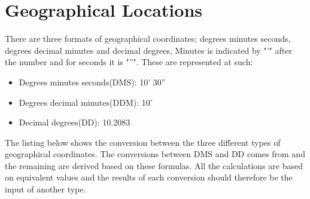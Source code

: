 \section{Geographical Locations} \label{sec:geo_coordinates}
There are three formats of geographical coordinates; degrees minutes seconds, degrees decimal minutes and decimal degrees\cite{geo_types}, Minutes is indicated by "'" after the number and for seconds it is "''". These are represented at such:
\begin{itemize}
	\item Degrees minutes seconds(DMS): 10' 30''
	\item Degrees decimal minutes(DDM): 10'
	\item Decimal degrees(DD): 10.2083\degree
\end{itemize}

The listing below shows the conversion between the three different types of geographical coordinates. The conversions between DMS and DD comes from\cite{geo_converter} and the remaining are derived based on these formulas. All the calculations are based on equivalent values and the results of each conversion should therefore be the input of another type.


